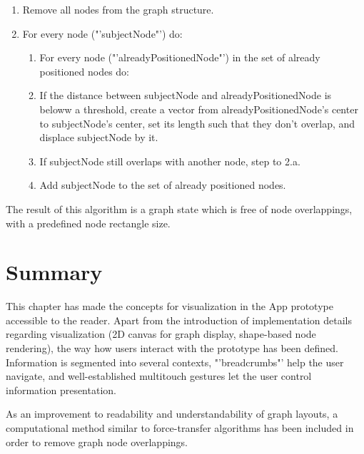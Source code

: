 \begin{enumerate}
\item Remove all nodes from the graph structure.	
\item For every node ("'subjectNode"') do:
	\begin{enumerate}
		\item For every node ("'alreadyPositionedNode"') in the set of already positioned nodes do:
		\item If the distance between subjectNode and alreadyPositionedNode is beloww a
		threshold, create a vector from alreadyPositionedNode's center to subjectNode's center, set
		its length such that they don't overlap, and displace subjectNode by it.
		\item If subjectNode still overlaps with another node, step to 2.a.
		\item Add subjectNode to the set of already positioned nodes.
	\end{enumerate}
\end{enumerate}

The result of this algorithm is a graph state which is free of node overlappings, with a predefined node rectangle size.

\section{Summary}

This chapter has made the concepts for visualization in the App prototype accessible to the reader. Apart from the introduction of implementation details regarding visualization (2D canvas for graph display, shape-based node rendering), the way how users interact with the prototype has been defined. Information is segmented into several contexts, "'breadcrumbs"' help the user navigate, and well-established multitouch gestures let the user control information presentation. 

As an improvement to readability and understandability of graph layouts, a computational method similar to force-transfer algorithms has been included in order to remove graph node overlappings.